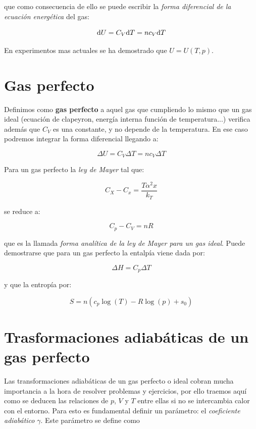 \documentclass[12pt,a4paper,oneside]{book}
\begin{document}
que como consecuencia de ello se puede escribir la \textit{forma diferencial de la ecuación energética} del gas:

\begin{equation}
\mathrm{d} U = C_V \mathrm{d} T = n c_V \mathrm{d} T
\end{equation}

En experimentos mas actuales se ha demostrado que $U=U(T,p)$. 

\section{Gas perfecto}

Definimos como \textbf{gas perfecto} a aquel gas que cumpliendo lo mismo que un gas ideal (ecuación de clapeyron, energía interna función de temperatura...) verifica además que $C_V$ es una constante, y no depende de la temperatura. En ese caso podremos integrar la forma diferencial llegando a:

\begin{equation}
\Delta U = C_V \Delta T = n c_V \Delta T
\end{equation}

Para un gas perfecto la \textit{ley de Mayer} tal que:

\begin{equation}
C_X - C_x = \dfrac{T \alpha^2 x}{k_T} 
\end{equation}

se reduce a:

\begin{equation}
C_p - C_V = nR
\end{equation}

que es la llamada \textit{forma analítica de la ley de Mayer para un gas ideal}. Puede demostrarse que para un gas perfecto la entalpía viene dada por:

\begin{equation}
\Delta H = C_p \Delta T
\end{equation}

y que la entropía por:

\begin{equation}
S = n (c_p \log (T) - R \log (p) + s_0)
\end{equation}

\section{Trasformaciones adiabáticas de un gas perfecto}

Las transformaciones adiabáticas de un gas perfecto o ideal cobran mucha importancia a la hora de resolver problemas y ejercicios, por ello traemos aquí como se deducen las relaciones de $p$, $V$ y $T$ entre ellas si no se intercambia calor con el entorno. Para esto es fundamental definir un parámetro: el \textit{coeficiente adiabático} $\gamma$. Este parámetro se define como
\end{document}
